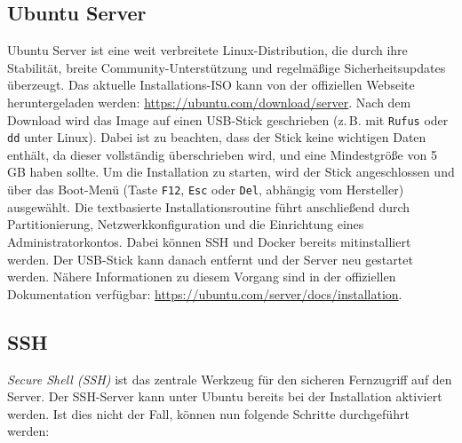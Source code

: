 \documentclass[12pt,a4paper]{report}
\begin{document}
  \subsection{Ubuntu Server}  
  Ubuntu Server ist eine weit verbreitete Linux-Distribution, die durch ihre Stabilität, breite Community-Unterstützung und regelmäßige Sicherheitsupdates überzeugt.  
  Das aktuelle Installations-ISO kann von der offiziellen Webseite heruntergeladen werden: \url{https://ubuntu.com/download/server}.  
  Nach dem Download wird das Image auf einen USB-Stick geschrieben (z.\,B. mit \texttt{Rufus} oder \texttt{dd} unter Linux).  
  Dabei ist zu beachten, dass der Stick keine wichtigen Daten enthält, da dieser vollständig überschrieben wird, und eine Mindestgröße von 5\,GB haben sollte.    
  Um die Installation zu starten, wird der Stick angeschlossen und über das Boot-Menü (Taste \texttt{F12}, \texttt{Esc} oder \texttt{Del}, abhängig vom Hersteller) ausgewählt.  
  Die textbasierte Installationsroutine führt anschließend durch Partitionierung, Netzwerkkonfiguration und die Einrichtung eines Administratorkontos. 
  Dabei können SSH und Docker bereits mitinstalliert werden. Der USB-Stick kann danach entfernt und der Server neu gestartet werden.
  Nähere Informationen zu diesem Vorgang sind in der offiziellen Dokumentation verfügbar: \url{https://ubuntu.com/server/docs/installation}.


  \subsection{SSH}  
  \emph{Secure Shell (SSH)} ist das zentrale Werkzeug für den sicheren Fernzugriff auf den Server.  
  Der SSH-Server kann unter Ubuntu bereits bei der Installation aktiviert werden. 
  Ist dies nicht der Fall, können nun folgende Schritte durchgeführt werden:  
\end{document}
